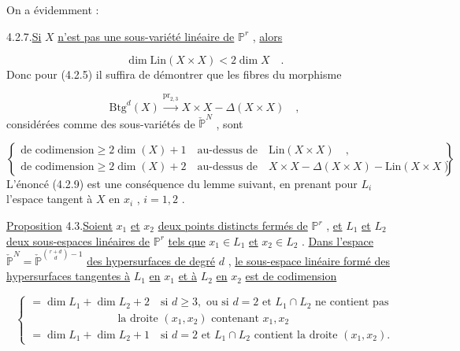
On a évidemment :

4.2.7.\quad \underline{Si} $X$ \underline{n'est pas une sous-variété linéaire de} $\mathbb{P}^r$ , \underline{alors}

\begin{equation*}
\dim \mathrm{Lin}(X \times X) < 2\dim X \quad .
\end{equation*}
Donc pour (4.2.5) il suffira de démontrer que les fibres du morphisme

\begin{equation}\tag{4.2.8}
\mathrm{Btg}^d(X) \stackrel{\mathrm{pr}_{2,3}}{\longrightarrow} X \times X - \Delta(X \times X) \quad ,
\end{equation}
considérées comme des sous-variétés de $\check{\mathbb{P}}^N$ , sont

\begin{equation}\tag{4.2.9}
\left\{
\begin{array}{l}
\mbox{de codimension} \geq 2\dim(X)+1 \quad \mbox{au-dessus de} \quad \mathrm{Lin}(X{\times}X) \quad , \\[2ex]
\mbox{de codimension} \geq 2\dim(X)+2 \quad \mbox{au-dessus de} \quad X{\times}X-\Delta(X{\times}X)-\mathrm{Lin}(X{\times}X)
\end{array}
\right\} \quad .
\end{equation}
L'énoncé (4.2.9) est une conséquence du lemme suivant, en prenant pour $L_i$ l'espace tangent à $X$ en $x_i$ , $i=1,2$ .

\underline{Proposition} 4.3.\quad \underline{Soient} $x_1$ \underline{et} $x_2$ \underline{deux points distincts fermés de} $\mathbb{P}^r$ , \underline{et} $L_1$ \underline{et} $L_2$ \underline{deux sous-espaces linéaires de} $\mathbb{P}^r$ \underline{tels que} $x_1 \in L_1$ \underline{et} $x_2 \in L_2$ . \underline{Dans l'espace} $\check{\mathbb{P}}^N = \check{\mathbb{P}}^{\binom{r+d}{d}-1}$ \underline{des hypersurfaces de degré} $d$ , \underline{le sous-espace linéaire formé des hypersurfaces tangentes à} $L_1$ \underline{en} $x_1$ \underline{et à} $L_2$ \underline{en} $x_2$ \underline{est de codimension}

\begin{equation*}
\left\{
\begin{array}{l}
= \dim L_1+\dim L_2+2 \quad \mbox{si } d\geq 3, \mbox{ ou si } d=2 \mbox{ et } L_1 \cap L_2 \mbox{ ne contient pas} \\[1ex]
\qquad\qquad\qquad\qquad \mbox{la droite } (x_1,x_2) \mbox{ contenant } x_1,x_2 \\[2ex]
= \dim L_1+\dim L_2+1 \quad \mbox{si } d=2 \mbox{ et } L_1 \cap L_2 \mbox{ contient la droite } (x_1,x_2).
\end{array}
\right.
\end{equation*}

